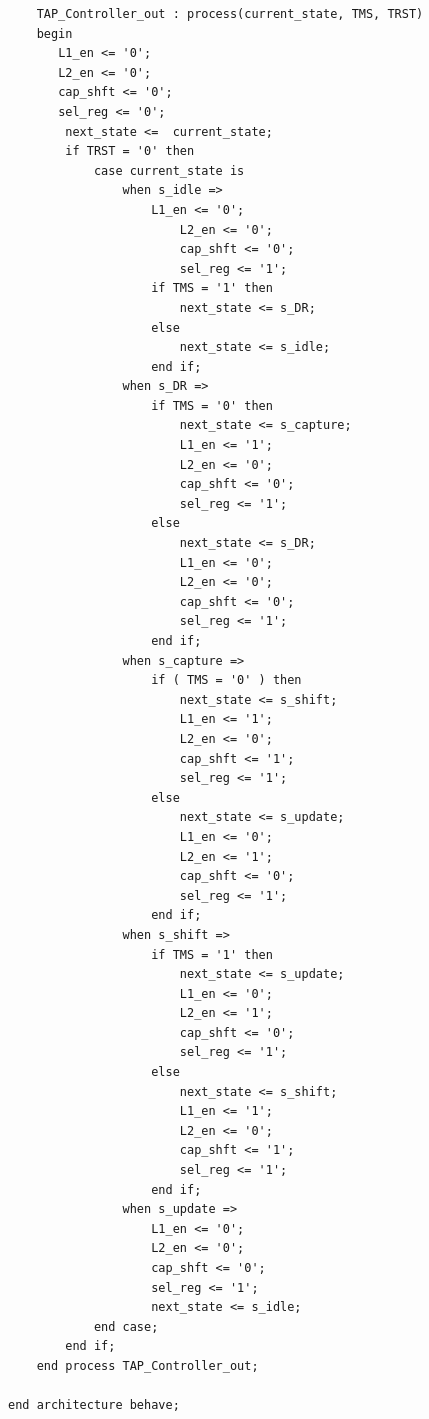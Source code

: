 \documentclass[12pt]{article}
\begin{document}
\begin{verbatim}
	TAP_Controller_out : process(current_state, TMS, TRST)
	begin
	   L1_en <= '0';
	   L2_en <= '0';
	   cap_shft <= '0';
	   sel_reg <= '0';
		next_state <=  current_state;
		if TRST = '0' then
			case current_state is
				when s_idle =>
					L1_en <= '0';
						L2_en <= '0';
						cap_shft <= '0';
						sel_reg <= '1';
					if TMS = '1' then
						next_state <= s_DR;
					else
						next_state <= s_idle;
					end if;
				when s_DR =>
					if TMS = '0' then
						next_state <= s_capture;
						L1_en <= '1';
						L2_en <= '0';
						cap_shft <= '0';
						sel_reg <= '1';
					else
						next_state <= s_DR;
						L1_en <= '0';
						L2_en <= '0';
						cap_shft <= '0';
						sel_reg <= '1';
					end if;
				when s_capture =>
					if ( TMS = '0' ) then
						next_state <= s_shift;
						L1_en <= '1';
						L2_en <= '0';
						cap_shft <= '1';
						sel_reg <= '1';
					else
						next_state <= s_update;
						L1_en <= '0';
						L2_en <= '1';
						cap_shft <= '0';
						sel_reg <= '1';
					end if;
				when s_shift =>
					if TMS = '1' then
						next_state <= s_update;
						L1_en <= '0';
						L2_en <= '1';
						cap_shft <= '0';
						sel_reg <= '1';
					else
						next_state <= s_shift;
						L1_en <= '1';
						L2_en <= '0';
						cap_shft <= '1';
						sel_reg <= '1';
					end if;
				when s_update =>
					L1_en <= '0';
					L2_en <= '0';
					cap_shft <= '0';
					sel_reg <= '1';
					next_state <= s_idle;
			end case;
		end if;
	end process TAP_Controller_out;

end architecture behave;

        \end{verbatim}
\end{document}
